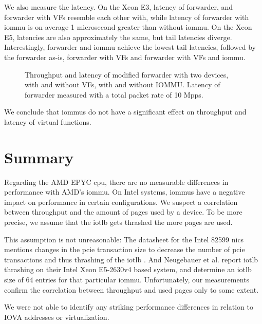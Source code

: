 We also measure the latency. On the Xeon E3, latency of forwarder, and forwarder
with VFs resemble each other with, while latency of forwarder with \ac{iommu} is
on average 1 microsecond greater than without \ac{iommu}. On the Xeon E5,
latencies are also approximately the same, but tail latencies diverge.
Interestingly, forwarder and \ac{iommu} achieve the lowest tail latencies,
followed by the forwarder as-is, forwarder with VFs and forwarder with VFs and
\ac{iommu}.

\begin{figure}%
	\centering
    \par

    \caption{Throughput and latency of modified forwarder with two devices, with
    and without VFs, with and without IOMMU. Latency of forwarder measured with
    a total packet rate of 10 Mpps.}
	\label{fig:sriov-baseline}
\end{figure}

We conclude that \acp{iommu} do not have a significant effect on throughput and
latency of virtual functions.


\section{Summary}
\label{sec:perf_summary}

Regarding the AMD EPYC \ac{cpu}, there are no measurable differences in
performance with AMD's \ac{iommu}. On Intel systems, \acp{iommu} have a negative
impact on performance in certain configurations. We suspect a correlation
between throughput and the amount of pages used by a device. To be more precise,
we assume that the \ac{iotlb} gets thrashed the more pages are used.

This assumption is not unreasonable: The datasheet for the Intel 82599 \acp{nic}
mentions changes in the \ac{pcie} transaction size to decrease the number of
\ac{pcie} transactions and thus thrashing of the \ac{iotlb}
\cite[p.~34]{intel2016datasheet}. And Neugebauer et al.
\cite{neugebauer2018understanding} report \ac{iotlb} thrashing on their Intel
Xeon E5-2630v4 based system, and determine an \ac{iotlb} size of 64 entries for
that particular \ac{iommu}. Unfortunately, our measurements confirm the
correlation between throughput and used pages only to some extent.

We were not able to identify any striking performance differences in relation to
IOVA addresses or virtualization.

